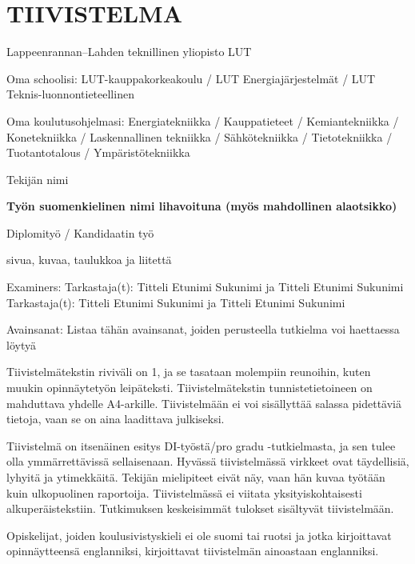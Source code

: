 \chapter*{TIIVISTELMA}

Lappeenrannan–Lahden teknillinen yliopisto LUT

Oma schoolisi: LUT-kauppakorkeakoulu / LUT Energiajärjestelmät / LUT Teknis-luonnontieteellinen

Oma koulutusohjelmasi: Energiatekniikka / Kauppatieteet / Kemiantekniikka / Konetekniikka / Laskennallinen tekniikka / Sähkötekniikka / Tietotekniikka / Tuotantotalous / Ympäristötekniikka

\hspace{1em}

Tekijän nimi

\hspace{1em}

\textbf{Työn suomenkielinen nimi lihavoituna (myös mahdollinen alaotsikko)}

\hspace{1em}

Diplomityö / Kandidaatin työ

\the\year{}

 sivua,   kuvaa,  taulukkoa ja  liitettä

\begin{flushleft}
	Examiners: Tarkastaja(t): Titteli Etunimi Sukunimi ja Titteli Etunimi Sukunimi\\
	\hspace{19.5mm} Tarkastaja(t): Titteli Etunimi Sukunimi ja Titteli Etunimi Sukunimi
\end{flushleft}

Avainsanat: Listaa tähän avainsanat, joiden perusteella tutkielma voi haettaessa löytyä

\hspace{1em}

Tiivistelmätekstin riviväli on 1, ja se tasataan molempiin reunoihin, kuten muukin opinnäytetyön leipäteksti. Tiivistelmätekstin tunnistetietoineen on mahduttava yhdelle A4-arkille. Tiivistelmään ei voi sisällyttää salassa pidettäviä tietoja, vaan se on aina laadittava julkiseksi.

Tiivistelmä on itsenäinen esitys DI-työstä/pro gradu -tutkielmasta, ja sen tulee olla ymmärrettävissä sellaisenaan. Hyvässä tiivistelmässä virkkeet ovat täydellisiä, lyhyitä ja ytimekkäitä. Tekijän mielipiteet eivät näy, vaan hän kuvaa työtään kuin ulkopuolinen raportoija. Tiivistelmässä ei viitata yksityiskohtaisesti alkuperäistekstiin. Tutkimuksen keskeisimmät tulokset sisältyvät tiivistelmään.

Opiskelijat, joiden koulusivistyskieli ei ole suomi tai ruotsi ja jotka kirjoittavat opinnäytteensä englanniksi, kirjoittavat tiivistelmän ainoastaan englanniksi.